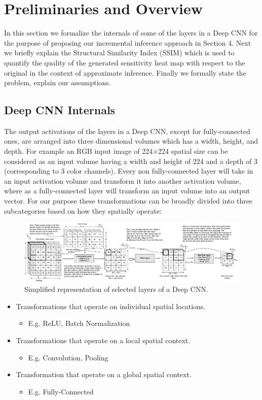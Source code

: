 \section{Preliminaries and Overview}\label{sec:preliminaries}
In this section we formalize the internals of some of the layers in a Deep CNN for the purpose of proposing our incremental inference approach in Section 4. Next we briefly explain the Structural Similarity Index (SSIM) which is used to quantify the quality of the generated sensitivity heat map with respect to the original in the context of approximate inference. Finally we formally state the problem, explain our assumptions.

\subsection{Deep CNN Internals}
The output activations of the layers in a Deep CNN, except for fully-connected ones, are arranged into three dimensional volumes which has a width, height, and depth.
For example an RGB input image of 224$\times$224 spatial size can be considered as an input volume having a width and height of 224 and a depth of 3 (corresponding to 3 color channels). Every non fully-connected layer will take in an input activation volume and transform it into another activation volume, where as a fully-connected layer will transform an input volume into an output vector. For our purpose these transformations can be broadly divided into three subcategories based on how they spatially operate:

\begin{figure}[t]
\includegraphics[width=\textwidth]{images/cnn_simplified}
\caption{Simplified representation of selected layers of a Deep CNN.}

\end{figure}

\begin{itemize}
	\item Transformations that operate on individual spatial locations.
	\begin{itemize}
	 \item E.g. ReLU, Batch Normalization
	\end{itemize}
	\item Transformations that operate on a local spatial context.
	\begin{itemize}
	 \item E.g. Convolution, Pooling
	\end{itemize}
	\item Transformation that operate on a global spatial context.
	\begin{itemize}
	 \item E.g. Fully-Connected
	\end{itemize}
\end{itemize}

